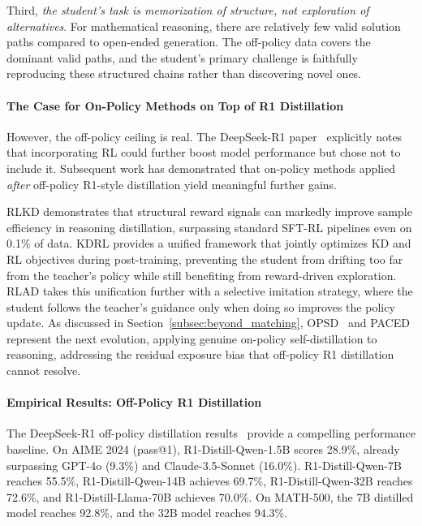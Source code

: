 \documentclass{article} %
\begin{document}
Third, \emph{the student's task is memorization of structure, not exploration of alternatives}. For mathematical reasoning, there are relatively few valid solution paths compared to open-ended generation. The off-policy data covers the dominant valid paths, and the student's primary challenge is faithfully reproducing these structured chains rather than discovering novel ones.

\paragraph{The Case for On-Policy Methods on Top of R1 Distillation}
However, the off-policy ceiling is real. The DeepSeek-R1 paper~\citep{2501.12948} explicitly notes that incorporating RL could further boost model performance but chose not to include it. Subsequent work has demonstrated that on-policy methods applied \emph{after} off-policy R1-style distillation yield meaningful further gains.

RLKD \citep{2505.16142} demonstrates that structural reward signals can markedly improve sample efficiency in reasoning distillation, surpassing standard SFT-RL pipelines even on 0.1\% of data.
KDRL \citep{2506.02208} provides a unified framework that jointly optimizes KD and RL objectives during post-training, preventing the student from drifting too far from the teacher's policy while still benefiting from reward-driven exploration.
RLAD \citep{2602.22495} takes this unification further with a selective imitation strategy, where the student follows the teacher's guidance only when doing so improves the policy update.
As discussed in Section~\ref{subsec:beyond_matching}, OPSD~\citep{2601.18734} and PACED~\citep{2603.11178} represent the next evolution, applying genuine on-policy self-distillation to reasoning, addressing the residual exposure bias that off-policy R1 distillation cannot resolve.

\paragraph{Empirical Results: Off-Policy R1 Distillation}
The DeepSeek-R1 off-policy distillation results~\citep{2501.12948} provide a compelling performance baseline. On AIME 2024 (pass@1), R1-Distill-Qwen-1.5B scores 28.9\%, already surpassing GPT-4o (9.3\%) and Claude-3.5-Sonnet (16.0\%). R1-Distill-Qwen-7B reaches 55.5\%, R1-Distill-Qwen-14B achieves 69.7\%, R1-Distill-Qwen-32B reaches 72.6\%, and R1-Distill-Llama-70B achieves 70.0\%. On MATH-500, the 7B distilled model reaches 92.8\%, and the 32B model reaches 94.3\%.
\end{document}
